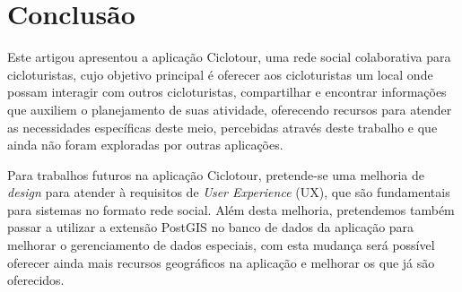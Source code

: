 \section{Conclusão}
Este artigou apresentou a aplicação Ciclotour, uma rede social colaborativa para cicloturistas, cujo objetivo principal é oferecer aos cicloturistas 
um local onde possam interagir com outros cicloturistas, compartilhar e encontrar informações que auxiliem o planejamento de suas atividade, 
oferecendo recursos para atender as necessidades específicas deste meio, percebidas através deste trabalho e que ainda não foram exploradas por 
outras aplicações.

Para trabalhos futuros na aplicação Ciclotour, pretende-se uma melhoria de \textit{design} para atender à requisitos de \textit{User Experience} (UX),
que são fundamentais para sistemas no formato rede social. Além desta melhoria, pretendemos também passar a utilizar a extensão PostGIS no banco de 
dados da aplicação para melhorar o gerenciamento de dados especiais, com esta mudança será possível oferecer ainda mais recursos geográficos na 
aplicação e melhorar os que já são oferecidos.



